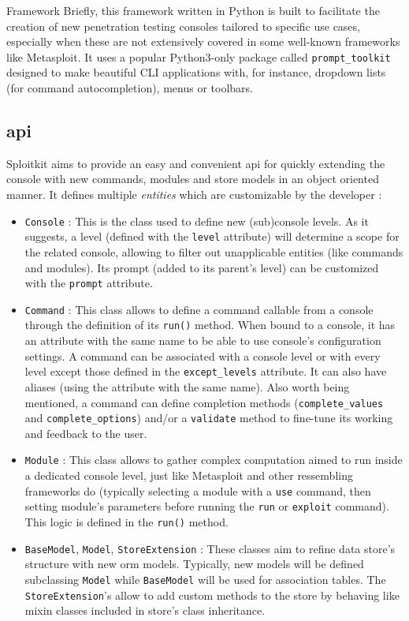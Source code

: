 \begin{chaptercover}{Framework}
Briefly, this framework written in Python is built to facilitate the creation of new penetration testing consoles tailored to specific use cases, especially when these are not extensively covered in some well-known frameworks like Metasploit. It uses a popular Python3-only package called \texttt{prompt\_toolkit} \cite{prompt-toolkit} designed to make beautiful CLI applications with, for instance, dropdown lists (for command autocompletion), menus or toolbars.

\subsection{\acrlong{api}}

Sploitkit aims to provide an easy and convenient \acrshort{api} for quickly extending the console with new commands, modules and store models in an object oriented manner. It defines multiple \textit{entities} which are customizable by the developer :
\begin{itemize}
  \item \texttt{Console} : This is the class used to define new (sub)console levels. As it suggests, a level (defined with the \texttt{level} attribute) will determine a scope for the related console, allowing to filter out unapplicable entities (like commands and modules). Its prompt (added to its parent's level) can be customized with the \texttt{prompt} attribute.
  \item \texttt{Command} : This class allows to define a command callable from a console through the definition of its \texttt{run()} method. When bound to a console, it has an attribute with the same name to be able to use console's configuration settings. A command can be associated with a console level or with every level except those defined in the \texttt{except\_levels} attribute. It can also have aliases (using the attribute with the same name). Also worth being mentioned, a command can define completion methods (\texttt{complete\_values} and \texttt{complete\_options}) and/or a \texttt{validate} method to fine-tune its working and feedback to the user.
  \item \texttt{Module} : This class allows to gather complex computation aimed to run inside a dedicated console level, just like Metasploit and other ressembling frameworks do (typically selecting a module with a \texttt{use} command, then setting module's parameters before running the \texttt{run} or \texttt{exploit} command). This logic is defined in the \texttt{run()} method.
  \item \texttt{BaseModel}, \texttt{Model}, \texttt{StoreExtension} : These classes aim to refine data store's structure with new \acrshort{orm} models. Typically, new models will be defined subclassing \texttt{Model} while \texttt{BaseModel} will be used for association tables. The \texttt{StoreExtension}'s allow to add custom methods to the store by behaving like mixin classes included in store's class inheritance.
\end{itemize}


\end{chaptercover}

